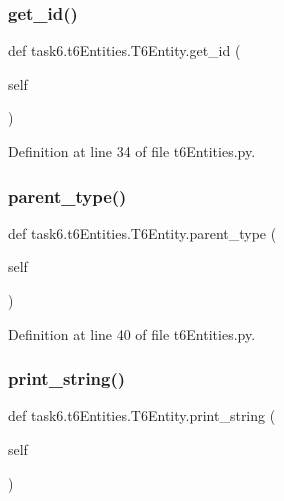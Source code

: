 \subsubsection{\texorpdfstring{get\+\_\+id()}{get\_id()}}
{\footnotesize\ttfamily def task6.\+t6\+Entities.\+T6\+Entity.\+get\+\_\+id (\begin{DoxyParamCaption}\item[{}]{self }\end{DoxyParamCaption})}



Definition at line 34 of file t6\+Entities.\+py.

\mbox{\label{classtask6_1_1t6Entities_1_1T6Entity_a3463d49b756cd711c82ce3505521e3ff}} 
\subsubsection{\texorpdfstring{parent\+\_\+type()}{parent\_type()}}
{\footnotesize\ttfamily def task6.\+t6\+Entities.\+T6\+Entity.\+parent\+\_\+type (\begin{DoxyParamCaption}\item[{}]{self }\end{DoxyParamCaption})}



Definition at line 40 of file t6\+Entities.\+py.

\mbox{\label{classtask6_1_1t6Entities_1_1T6Entity_a5b8a42787e0d8c65840e69c56eaeeb93}} 
\subsubsection{\texorpdfstring{print\+\_\+string()}{print\_string()}}
{\footnotesize\ttfamily def task6.\+t6\+Entities.\+T6\+Entity.\+print\+\_\+string (\begin{DoxyParamCaption}\item[{}]{self }\end{DoxyParamCaption})}



